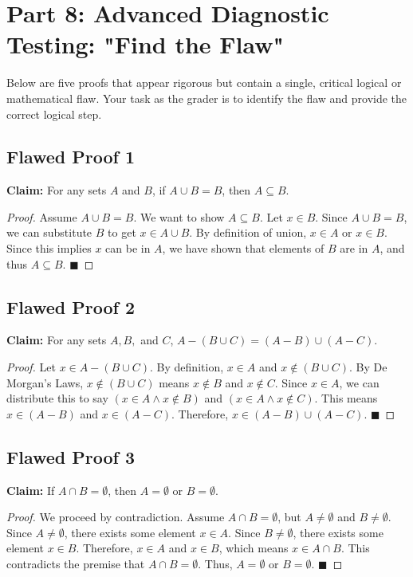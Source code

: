 \documentclass[11pt]{article}
\theoremstyle{definition}
\theoremstyle{remark}
\begin{document}
\newpage
\section{Part 8: Advanced Diagnostic Testing: "Find the Flaw"}

Below are five proofs that appear rigorous but contain a single, critical logical or mathematical flaw. Your task as the grader is to identify the flaw and provide the correct logical step.

\subsection{Flawed Proof 1}
\textbf{Claim:} For any sets $A$ and $B$, if $A \cup B = B$, then $A \subseteq B$.
\begin{proof}
Assume $A \cup B = B$. We want to show $A \subseteq B$. Let $x \in B$. Since $A \cup B = B$, we can substitute $B$ to get $x \in A \cup B$. By definition of union, $x \in A$ or $x \in B$. Since this implies $x$ can be in $A$, we have shown that elements of $B$ are in $A$, and thus $A \subseteq B$. $\blacksquare$
\end{proof}

\subsection{Flawed Proof 2}
\textbf{Claim:} For any sets $A, B,$ and $C$, $A - (B \cup C) = (A - B) \cup (A - C)$.
\begin{proof}
Let $x \in A - (B \cup C)$. By definition, $x \in A$ and $x \notin (B \cup C)$. 
By De Morgan's Laws, $x \notin (B \cup C)$ means $x \notin B$ and $x \notin C$. 
Since $x \in A$, we can distribute this to say $(x \in A \land x \notin B)$ and $(x \in A \land x \notin C)$. 
This means $x \in (A - B)$ and $x \in (A - C)$. 
Therefore, $x \in (A - B) \cup (A - C)$. $\blacksquare$
\end{proof}

\subsection{Flawed Proof 3}
\textbf{Claim:} If $A \cap B = \emptyset$, then $A = \emptyset$ or $B = \emptyset$.
\begin{proof}
We proceed by contradiction. Assume $A \cap B = \emptyset$, but $A \neq \emptyset$ and $B \neq \emptyset$. 
Since $A \neq \emptyset$, there exists some element $x \in A$. 
Since $B \neq \emptyset$, there exists some element $x \in B$. 
Therefore, $x \in A$ and $x \in B$, which means $x \in A \cap B$. 
This contradicts the premise that $A \cap B = \emptyset$. Thus, $A = \emptyset$ or $B = \emptyset$. $\blacksquare$
\end{proof}
\end{document}
